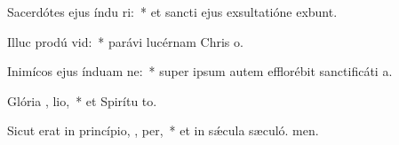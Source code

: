 \item Sacerdótes ejus índu ri:~* et sancti ejus exsultatióne exbunt.
\item Illuc prodú  vid:~* parávi lucérnam Chris o.
\item Inimícos ejus índuam ne:~* super ipsum autem efflorébit sanctificáti a.
\item Glória ,  lio,~* et Spirítu to.
\item Sicut erat in princípio,  ,  per,~* et in sǽcula sæculó. men.

